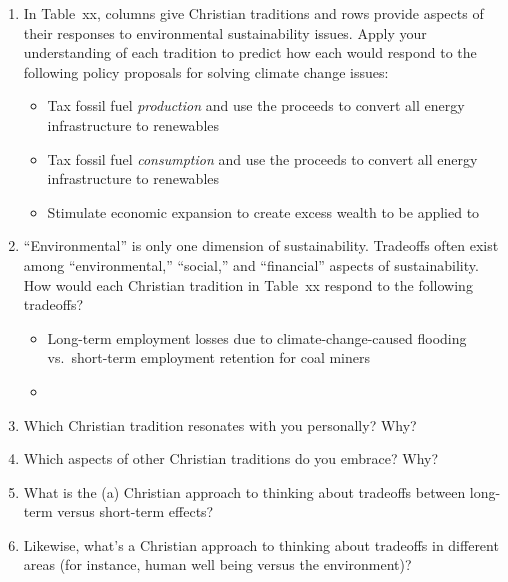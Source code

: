 \documentclass[12pt]{article}
\begin{document}
%
\begin{enumerate}

  \item In Table~xx, columns give Christian traditions
        and rows provide aspects of their responses
		to environmental sustainability issues. 
		Apply your understanding of each tradition to 
		predict how each would respond to the following policy proposals
		for solving climate change issues:
		\begin{itemize}

		  \item Tax fossil fuel \emph{production} and use the proceeds to 
		        convert all energy infrastructure to renewables
		  
		  \item Tax fossil fuel \emph{consumption} and use the proceeds to 
		        convert all energy infrastructure to renewables

		  \item Stimulate economic expansion to create excess wealth to be applied to 

		\end{itemize}
  \item ``Environmental'' is only one dimension of sustainability. 
        Tradeoffs often exist among ``environmental,'' ``social,'' and ``financial'' 
		aspects of sustainability. 
		How would each Christian tradition in Table~xx respond to the following tradeoffs?
		\begin{itemize}

		  \item Long-term employment losses due to climate-change-caused flooding vs.\ 
		        short-term employment retention for coal miners

		  \item

		\end{itemize}
  \item Which Christian tradition resonates with you personally? Why?
  
  \item Which aspects of other Christian traditions do you embrace? Why?

  \item What is the (a) Christian approach to thinking about tradeoffs 
        between long-term versus short-term effects?
		
  \item Likewise, what's a Christian approach to thinking about tradeoffs in different areas
        (for instance, human well being versus the environment)?


\end{enumerate}
\end{document}

